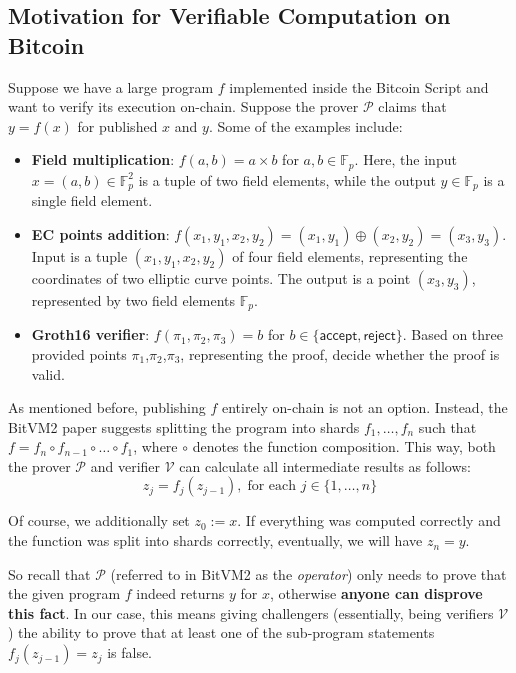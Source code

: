 \documentclass{iacrtrans}
\begin{document}
\subsection{Motivation for Verifiable Computation on Bitcoin}
Suppose we have a large program $f$ implemented inside the Bitcoin Script and
want to verify its execution on-chain. Suppose the prover $\mathcal{P}$ claims
that ${y} = f({x})$ for published ${x}$ and ${y}$. Some of the examples include:
\begin{itemize}
    \item \textbf{Field multiplication}: $f(a,b) = a \times b$ for $a,b \in
    \mathbb{F}_p$. Here, the input ${x}=(a,b) \in \mathbb{F}_p^2$ is a tuple of
    two field elements, while the output $y \in \mathbb{F}_p$ is a single field
    element.
    \item \textbf{EC points addition}: $f(x_1,y_1,x_2,y_2) = (x_1,y_1) \oplus
    (x_2,y_2) = (x_3,y_3)$. Input is a tuple $(x_1,y_1,x_2,y_2)$ of four field
    elements, representing the coordinates of two elliptic curve points. The
    output is a point $(x_3,y_3)$, represented by two field elements
    $\mathbb{F}_p$.
    \item \textbf{Groth16 verifier}: $f(\pi_1,\pi_2,\pi_3) = b$ for $b \in
    \{\mathsf{accept}, \mathsf{reject}\}$. Based on three provided points
    $\pi_1$,$\pi_2$,$\pi_3$, representing the proof, decide whether the proof is
    valid.
\end{itemize}

As mentioned before, publishing $f$ entirely on-chain is not an option. Instead,
the BitVM2 paper suggests splitting the program into shards $f_1,\dots,f_n$ such
that $f=f_n \circ f_{n-1} \circ \dots \circ f_1$, where $\circ$ denotes the
function composition. This way, both the prover $\mathcal{P}$ and verifier
$\mathcal{V}$ can calculate all intermediate results as follows:
\begin{equation*}
    {z}_j = f_j({z}_{j-1}), \; \text{for each $j \in \{1,\dots,n\}$}
\end{equation*}

Of course, we additionally set ${z}_0 := {x}$. If everything was computed
correctly and the function was split into shards correctly, eventually, we will
have ${z}_n = {y}$.  

So recall that $\mathcal{P}$ (referred to in BitVM2 as the \textit{operator})
only needs to prove that the given program $f$ indeed returns ${y}$ for \({x}\),
otherwise \textbf{anyone can disprove this fact}. In our case, this means giving
challengers (essentially, being verifiers $\mathcal{V}$) the ability to prove
that at least one of the sub-program statements \(f_j({z}_{j-1}) = {z}_j\) is
false.
\end{document}
